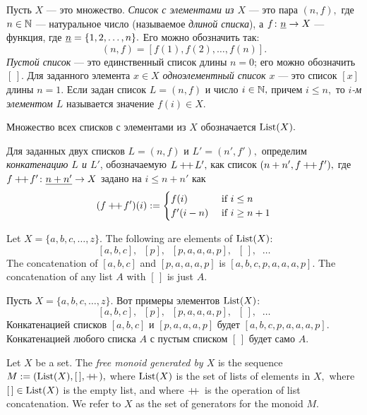 \documentclass[CT4S-EN-RU]{subfiles}
\begin{document}
\begin{definitionRUS}\label{def:list}
Пусть $X$ — это множество. {\em Список с элементами из $X$} — это пара $(n,f),$ где $n\in{\mathbb N}$ — натуральное число (называемое {\em длиной списка}), а $f\colon\underline{n}\rightarrow X$ — функция, где $\underline{n}=\{1,2,\ldots,n\}.$ Его можно обозначить так:
$$(n,f)=[f(1),f(2),\ldots,f(n)].$$
{\em Пустой список} — это единственный список длины $n=0$; его можно обозначить $[\,].$ Для заданного элемента $x\in X$ {\em одноэлементный список $x$} — это список $[x]$ длины $n=1$. Если задан список $L=(n,f)$ и число $i\in{\mathbb N},$ причем $i\leq n,$ то {\em $i$-м элементом $L$} называется значение $f(i)\in X.$ 

Множество всех списков с элементами из $X$ обозначается $\operatorname{List}(X).$

Для заданных двух списков $L=(n,f)$ и $L'=(n',f'),$ определим {\em конкатенацию $L$ и $L'$}, обозначаемую $L+\!\!+\hspace{1pt} L',$ как список $(n+n',f+\!\!+\hspace{1pt} f'),$ где $f+\!\!+\hspace{1pt} f'\colon \underline{n+n'}\rightarrow X$ задано на $i\leq n+n'$ как
$$(f+\!\!+\hspace{1pt} f')(i):=
\begin{cases}
f(i)&\textnormal{ if }i\leq n\\
f'(i-n)&\textnormal{ if }i\geq n+1
\end{cases}
$$
\end{definitionRUS}

\begin{exampleENG}
Let $X=\{a,b,c,\ldots,z\}.$ The following are elements of $\operatorname{List}(X)$: $$[a,b,c],\;\; [p],\;\; [p,a,a,a,p],\;\; [\,],\;\;\dots$$ The concatenation of $[a,b,c]$ and $[p,a,a,a,p]$ is $[a,b,c,p,a,a,a,p].$ The concatenation of any list $A$ with $[\,]$ is just $A.$
\end{exampleENG}

\begin{exampleRUS}
Пусть $X=\{a,b,c,\ldots,z\}.$ Вот примеры элементов $\operatorname{List}(X)$: $$[a,b,c],\;\; [p],\;\; [p,a,a,a,p],\;\; [\,],\;\;\dots$$ Конкатенацией списков $[a,b,c]$ и $[p,a,a,a,p]$ будет $[a,b,c,p,a,a,a,p].$ Конкатенацией любого списка $A$ с пустым списком $[\,]$ будет само $A.$
\end{exampleRUS}

\begin{definitionENG}\label{def:free monoid}
Let $X$ be a set. The {\em free monoid generated by $X$} is the sequence $M:=(\operatorname{List}(X),[\,],+\!\!+\hspace{1pt}),$ where $\operatorname{List}(X)$ is the set of lists of elements in $X,$ where $[\,]\in\operatorname{List}(X)$ is the empty list, and where $+\!\!+\hspace{1pt}$ is the operation of list concatenation. We refer to $X$ as the set of generators for the monoid $M.$
\end{definitionENG}
\end{document}
